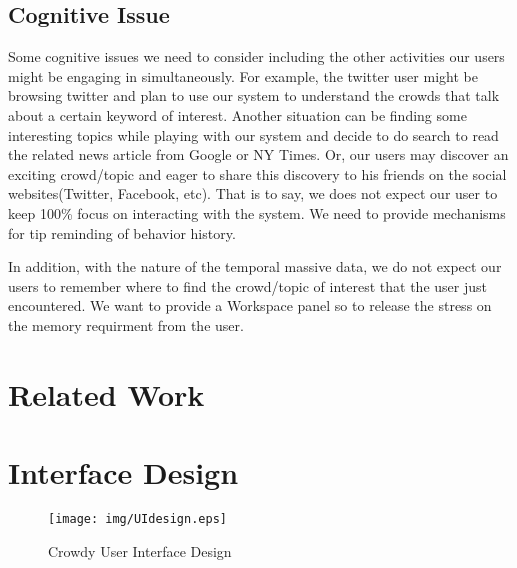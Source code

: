 \documentclass{sig-alternate}
\begin{document}
\subsection{Cognitive Issue}
Some cognitive issues we need to consider including the other activities our
users might be engaging in simultaneously. For example, the twitter user might
be browsing twitter and plan to use our system to understand the crowds that
talk about a certain keyword of interest. Another situation can be finding some
interesting topics while playing with our system and decide to do search to
read the related news article from Google or NY Times. Or, our users may
discover an exciting crowd/topic and eager to share this discovery to his
friends on the social websites(Twitter, Facebook, etc). That is to say, we does
not expect our user to keep 100\% focus on interacting with the system. We need
to provide mechanisms for tip reminding of behavior history. 

In addition, with the nature of the temporal massive data, we do not expect our
users to remember where to find the crowd/topic of interest that the user just
encountered. We want to provide a Workspace panel so to release the stress on
the memory requirment from the user.

\section{Related Work}

\section{Interface Design}

\begin{figure*}[t]
\centering
\texttt{[image: img/UIdesign.eps]}
\caption{Crowdy User Interface Design}
\label{fig:UIdesign}
\end{figure*}
\end{document}
